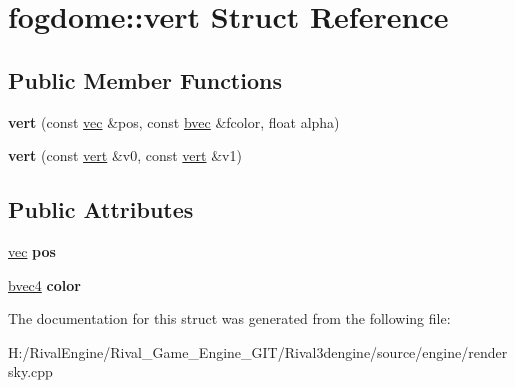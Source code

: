 \hypertarget{structfogdome_1_1vert}{}\section{fogdome\+:\+:vert Struct Reference}
\label{structfogdome_1_1vert}
\subsection*{Public Member Functions}
\begin{DoxyCompactItemize}
\item 
\mbox{\label{structfogdome_1_1vert_ab7c2aa0cf76eedeeefa8627038563f5b}} 
{\bfseries vert} (const \hyperlink{structvec}{vec} \&pos, const \hyperlink{structbvec}{bvec} \&fcolor, float alpha)
\item 
\mbox{\label{structfogdome_1_1vert_a7de263cbb98fbef2d8addfaedc3de43a}} 
{\bfseries vert} (const \hyperlink{structfogdome_1_1vert}{vert} \&v0, const \hyperlink{structfogdome_1_1vert}{vert} \&v1)
\end{DoxyCompactItemize}
\subsection*{Public Attributes}
\begin{DoxyCompactItemize}
\item 
\mbox{\label{structfogdome_1_1vert_ac7d3508f28224f2916aa3f99f1696306}} 
\hyperlink{structvec}{vec} {\bfseries pos}
\item 
\mbox{\label{structfogdome_1_1vert_a4ff2b34ef721e940bb9f9691707ea7a7}} 
\hyperlink{structbvec4}{bvec4} {\bfseries color}
\end{DoxyCompactItemize}


The documentation for this struct was generated from the following file\+:\begin{DoxyCompactItemize}
\item 
H\+:/\+Rival\+Engine/\+Rival\+\_\+\+Game\+\_\+\+Engine\+\_\+\+G\+I\+T/\+Rival3dengine/source/engine/rendersky.\+cpp\end{DoxyCompactItemize}
